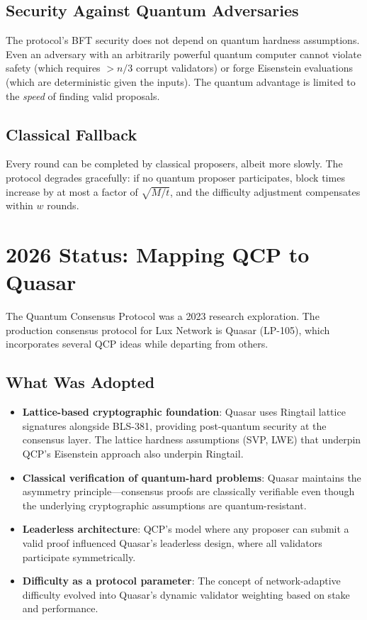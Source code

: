 \documentclass[11pt,a4paper]{article}
\begin{document}
\subsection{Security Against Quantum Adversaries}

The protocol's BFT security does not depend on quantum hardness
assumptions. Even an adversary with an arbitrarily powerful quantum
computer cannot violate safety (which requires $> n/3$ corrupt
validators) or forge Eisenstein evaluations (which are deterministic
given the inputs). The quantum advantage is limited to the \emph{speed}
of finding valid proposals.

\subsection{Classical Fallback}

Every round can be completed by classical proposers, albeit more
slowly. The protocol degrades gracefully: if no quantum proposer
participates, block times increase by at most a factor of
$\sqrt{M/t}$, and the difficulty adjustment compensates within $w$
rounds.

\section{2026 Status: Mapping QCP to Quasar}\label{sec:status}

The Quantum Consensus Protocol was a 2023 research exploration. The
production consensus protocol for Lux Network is Quasar (LP-105),
which incorporates several QCP ideas while departing from others.

\subsection{What Was Adopted}

\begin{itemize}[nosep]
  \item \textbf{Lattice-based cryptographic foundation}: Quasar uses
        Ringtail lattice signatures alongside BLS-381, providing
        post-quantum security at the consensus layer. The lattice
        hardness assumptions (SVP, LWE) that underpin QCP's Eisenstein
        approach also underpin Ringtail.
  \item \textbf{Classical verification of quantum-hard problems}: Quasar
        maintains the asymmetry principle---consensus proofs are
        classically verifiable even though the underlying cryptographic
        assumptions are quantum-resistant.
  \item \textbf{Leaderless architecture}: QCP's model where any
        proposer can submit a valid proof influenced Quasar's leaderless
        design, where all validators participate symmetrically.
  \item \textbf{Difficulty as a protocol parameter}: The concept of
        network-adaptive difficulty evolved into Quasar's dynamic
        validator weighting based on stake and performance.
\end{itemize}
\end{document}
